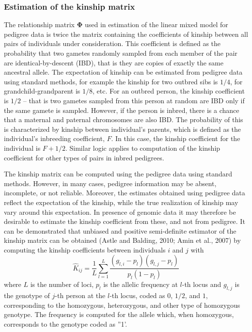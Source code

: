 \documentclass[12pt]{article}
\begin{document}
\subsubsection{Estimation of the kinship matrix}
\label{kinship}

The relationship matrix $\mathbf{\Phi}$ used in estimation of the 
linear mixed model for pedigree data is twice the matrix containing 
the coefficients of kinship between all pairs of individuals under consideration. 
This coefficient is defined as the probability that two gametes randomly sampled 
from each member of the pair are identical-by-descent (IBD), that is they are copies 
of exactly the same ancestral allele. The expectation of kinship 
can be estimated from pedigree data using standard methods, for example the 
kinship for two outbred sibs is $1/4$, for grandchild-grandparent is $1/8$, etc.
For an outbred person, the kinship coefficient is $1/2$ -- that is two gametes 
sampled from this person at random are IBD only if the same gamete is 
sampled. However, if the person is inbred, there is a chance that a maternal 
and paternal chromosomes are also IBD. The probability of this is characterized 
by kinship between individual's parents, which is defined as the individual's
inbreeding coefficient, $F$. In this case, the kinship coefficient for the 
individual is $F + 1/2$. Similar logic applies to computation of the kinship 
coefficient for other types of pairs in inbred pedigrees. 

The kinship matrix can be computed using the pedigree data using standard methods.
However, in many cases, pedigree information may be absent, incomplete, or not 
reliable. Moreover, the estimates obtained using pedigree data reflect the 
expectation of the kinship, while the true realization of kinship may vary 
around this expectation. In presence of genomic data it may therefore be 
desirable to estimate the kinship coefficient from these, and not from pedigree. 
It can be demonstrated that unbiased and positive semi-definite estimator 
of the kinship matrix can be obtained (Astle and Balding, 2010; Amin et al., 2007)
by computing the kinship coefficients between individuals $i$ and $j$ with
$$
\hat{K}_{ij} = \frac{1}{L} \sum_{l=1}^L \frac{ (g_{l,i} - p_l) (g_{l,j} - p_l) }{ p_l (1-p_l) }
$$
where $L$ is the number of loci, $p_l$ is the allelic frequency at $l$-th locus
and $g_{l,j}$ is the genotype of $j$-th person at the $l$-th locus, coded 
as $0$, $1/2$, and $1$, corresponding to the homozygous, heterozygous, and 
other type of homozygous genotype. The frequency is computed for the allele 
which, when homozygous, corresponds to the genotype coded as ''1'.
\end{document}
